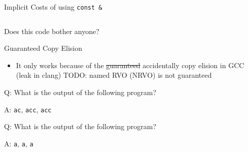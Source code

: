\documentclass[compress,aspectratio=1610]{beamer}
\newcommand{\inputcpplisting}[1]{}
\newcommand{\inputasmlisting}[1]{}
\begin{document}
\begin{frame}[fragile]{Implicit Costs of using \texttt{const \&}}
    \begin{columns}[t]
        \begin{column}{.45\textwidth}
            \inputasmlisting{snippet1b}
        \end{column}
        \begin{column}{.45\textwidth}
            \inputasmlisting{snippet2b}
        \end{column}
    \end{columns}
\end{frame}

\begin{frame}[fragile]
    \inputcpplisting{snippet8}
\end{frame}

\begin{frame}[fragile]{Does this code bother anyone?}
    \inputcpplisting{snippet3}
\end{frame}

\begin{frame}{Guaranteed Copy Elision}
    \begin{itemize}
        \item It only works because of the \st{guaranteed} accidentally copy elision in GCC (leak in clang) TODO: named RVO (NRVO) is not guaranteed
    \end{itemize}
\end{frame}

\begin{frame}[fragile]{Q: What is the output of the following program?}
    \inputcpplisting{snippet4a}
\end{frame}

\begin{frame}[fragile]{A: \texttt{ac}, \texttt{acc}, \texttt{acc}}
    \inputcpplisting{snippet4a}
\end{frame}

\begin{frame}[fragile]{Q: What is the output of the following program?}
    \inputcpplisting{snippet4b}
\end{frame}

\begin{frame}[fragile]{A: \texttt{a}, \texttt{a}, \texttt{a}}
    \inputcpplisting{snippet4b}
\end{frame}
\end{document}
